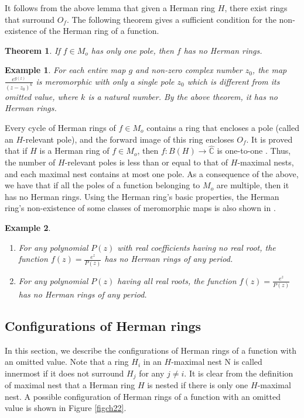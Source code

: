 \documentclass[12pt]{article}
\newtheorem{theorem}{Theorem}[section]
\newtheorem{ex}{Example}[section]
\begin{document}
It follows from the above lemma that given a Herman ring $H$, there exist rings that surround $O_f$. The following theorem gives a sufficient condition for the non-existence of the Herman ring of a function.
\begin{theorem}
	If $f\in M_o$ has only one pole, then $f$ has no Herman rings. 
\end{theorem} 
\begin{ex}
	For each entire map $g$ and non-zero complex number $z_0$, the map $\frac{e^{g(z)}}{(z-z_0)^k}$ is meromorphic with only a single pole $z_0$ which is different from its omitted value, where $k$ is a natural number. By the above theorem, it has no Herman rings.
\end{ex}
Every cycle of Herman rings of $f\in M_o$ contains a ring that encloses a pole (called an $H$-relevant pole), and the forward image of this ring encloses $O_f$. It is proved that if $H$ is a Herman ring of $f\in M_o$, then $f: B(H) \rightarrow \widehat{\mathbb{C}}$ is one-to-one \cite{tk}. Thus, the number of $H$-relevant poles is less than or equal to that of $H$-maximal nests, and each maximal nest contains at most one pole. As a consequence of the above, we have that if all the poles of a function belonging to $M_o$ are multiple, then it has no Herman rings. Using the Herman ring's basic properties, the Herman ring's non-existence of some classes of meromorphic maps is also shown in \cite{small}.  
\begin{ex}
	\begin{enumerate}
		\item 
		For any polynomial $P(z)$ with real coefficients having no real root, the function $f(z)=\frac{e^z}{P(z)}$ has no Herman rings of any period.
		\item For any polynomial $P(z)$ having all real roots, the function $f(z)=\frac{e^z}{P(z)}$ has no Herman rings of any period.
	\end{enumerate}
\end{ex}





\subsection{Configurations of Herman rings}

In this section, we describe the configurations of Herman rings of a function with an omitted value. Note that a ring $H_i$   in an $H$-maximal nest N is called innermost if it does not surround $H_j$ for any $j\neq i$.  It is clear from the definition of maximal nest that a Herman ring $H$ is nested if there is only one $H$-maximal nest. A possible configuration of Herman rings of a function with an omitted value is shown in Figure \ref{figch22}.
\end{document}
